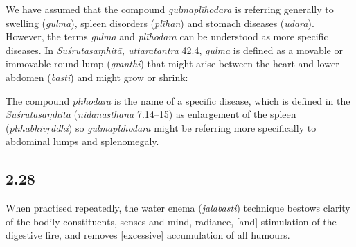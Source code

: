 \begin{ekdosis}
\begin{philcomm}[hp02_027]
We have assumed that the compound \emph{gulmaplīhodara} is referring generally to swelling (\emph{gulma}), spleen disorders (\emph{plīhan}) and stomach diseases (\emph{udara}). However, the terms \emph{gulma} and \emph{plīhodara} can be understood as more specific diseases. In \emph{Suśrutasaṃhitā, uttaratantra} 42.4, \emph{gulma} is defined as a movable or immovable round lump (\emph{granthi}) that might arise between the heart and lower abdomen (\emph{basti}) and might grow or shrink:

\begin{versinnote}
\end{versinnote}

The compound \emph{plīhodara} is the name of a specific disease, which is defined in the \emph{Suśrutasaṃhitā} (\emph{nidānasthāna} 7.14–15) as enlargement of the spleen (\emph{plīhābhivṛddhi}) so \emph{gulmaplīhodara} might be referring more specifically to abdominal lumps and splenomegaly.
\end{philcomm}

\subsection*{2.28}
\begin{translation}[hp02_028]
When practised repeatedly, the water enema (\emph{jalabasti}) technique bestows clarity of the bodily constituents, senses and mind, radiance, [and] stimulation of the digestive fire, and removes [excessive] accumulation of all humours.
\end{translation}



\end{ekdosis}

